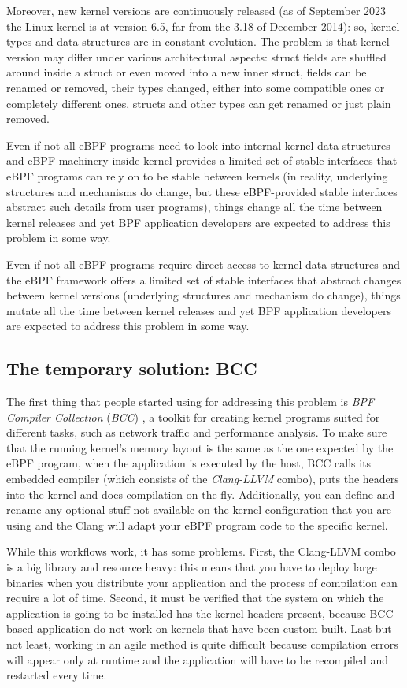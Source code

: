 Moreover, new kernel versions are continuously released (as of September 2023 the Linux kernel is at version 6.5, far from the 3.18 of December 2014): so, kernel types and data structures are in constant evolution.
The problem is that kernel version may differ under various architectural aspects: struct fields are shuffled around inside a struct or even moved into a new inner struct, fields can be renamed or removed, their types changed, either into some compatible ones or completely different ones, structs and other types can get renamed or just plain removed.

Even if not all eBPF programs need to look into internal kernel data structures and eBPF machinery inside kernel provides a limited set of stable interfaces that eBPF programs can rely on to be stable between kernels (in reality, underlying structures and mechanisms do change, but these eBPF-provided stable interfaces abstract such details from user programs), things change all the time between kernel releases and yet BPF application developers are expected to address this problem in some way. 

Even if not all eBPF programs require direct access to kernel data structures and the eBPF framework offers a limited set of stable interfaces that abstract changes between kernel versions (underlying structures and mechanism do change), things mutate all the time between kernel releases and yet BPF application developers are expected to address this problem in some way. 

\subsection{The temporary solution: BCC}

The first thing that people started using for addressing this problem is \textit{BPF Compiler Collection} (\textit{BCC}) \cite{BCCGitHub}, a toolkit for creating kernel programs suited for different tasks, such as network traffic and performance analysis.
To make sure that the running kernel's memory layout is the same as the one expected by the eBPF program, when the application is executed by the host, BCC calls its embedded compiler (which consists of the \textit{Clang-LLVM} combo), puts the headers into the kernel and does compilation on the fly.
Additionally, you can define and rename any optional stuff not available on the kernel configuration that you are using and the Clang will adapt your eBPF program code to the specific kernel.

While this workflows work, it has some problems.
First, the Clang-LLVM combo is a big library and resource heavy: this means that you have to deploy large binaries when you distribute your application and the process of compilation can require a lot of time.
Second, it must be verified that the system on which the application is going to be installed has the kernel headers present, because BCC-based application do not work on kernels that have been custom built.
Last but not least, working in an agile method is quite difficult because compilation errors will appear only at runtime and the application will have to be recompiled and restarted every time.

